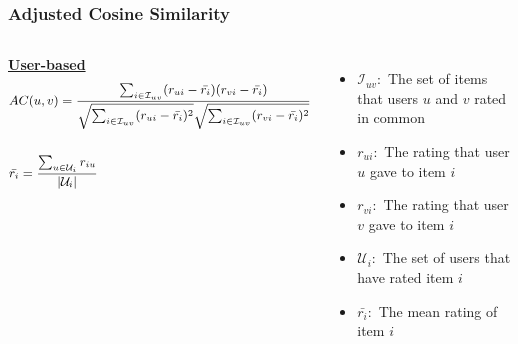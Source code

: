 \begin{frame}
    \frametitle{Adjusted Cosine Similarity}
    \vspace{-0.8cm}
    \begin{columns}
        \centering
        \underline{\textbf{User-based}}
        \begin{equation*}
            \small
            \begin{split}
            &AC(u,v) = \frac{\sum_{i \in \mathcal{I}_{uv}}(r_{ui}-\bar{r_{i}})(r_{vi}-\bar{r_{i}})}
        		    {\sqrt{\sum_{i \in \mathcal{I}_{uv}}(r_{ui}-\bar{r_{i}})^2}
                             \sqrt{\sum_{i \in \mathcal{I}_{uv}}(r_{vi}-\bar{r_{i}})^2}} \\\\
            &\bar{r_{i}} = \frac{\sum_{u \in \mathcal{U}_i}r_{iu}}
         		        {\mathopen|\mathcal{U}_i\mathclose|}
            \end{split}
        \end{equation*}
        \tiny
        \begin{itemize}
            \item $\mathcal{I}_{uv}:$ The set of items that users $u$ and $v$ rated in common
            \item $r_{ui}:$ The rating that user $u$ gave to item $i$
            \item $r_{vi}:$ The rating that user $v$ gave to item $i$
            \item $\mathcal{U}_{i}:$ The set of users that have rated item $i$
            \item $\bar{r_{i}}:$ The mean rating of item $i$


\end{itemize}
\end{columns}
\end{frame}
